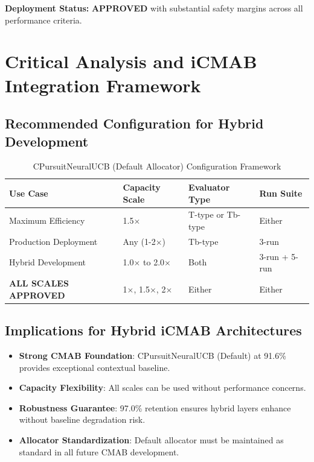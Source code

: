 \documentclass[12pt,a4paper]{article}
\newcommand{\success}[1]{\textcolor{accentgreen}{\textbf{#1}}}
\begin{document}
\textbf{Deployment Status:} \success{\textbf{APPROVED}} with substantial safety margins across all performance criteria.

\section{Critical Analysis and iCMAB Integration Framework}

\subsection{Recommended Configuration for Hybrid Development}

\begin{table}[H]
\centering
\caption{CPursuitNeuralUCB (Default Allocator) Configuration Framework}
\begin{tabular}{@{}llll@{}}
\toprule
\textbf{Use Case} & \textbf{Capacity Scale} & \textbf{Evaluator Type} & \textbf{Run Suite} \\
\midrule
Maximum Efficiency & 1.5$\times$ & T-type or Tb-type & Either \\
Production Deployment & Any (1-2$\times$) & Tb-type & 3-run \\
Hybrid Development & 1.0$\times$ to 2.0$\times$ & Both & 3-run + 5-run \\
\success{ALL SCALES APPROVED} & 1$\times$, 1.5$\times$, 2$\times$ & Either & Either \\
\bottomrule
\end{tabular}
\end{table}

\subsection{Implications for Hybrid iCMAB Architectures}

\begin{itemize}
    \item \textbf{Strong CMAB Foundation}: CPursuitNeuralUCB (Default) at 91.6\% provides exceptional contextual baseline.
    \item \textbf{Capacity Flexibility}: All scales can be used without performance concerns.
    \item \textbf{Robustness Guarantee}: 97.0\% retention ensures hybrid layers enhance without baseline degradation risk.
    \item \textbf{Allocator Standardization}: Default allocator must be maintained as standard in all future CMAB development.
\end{itemize}
\end{document}

